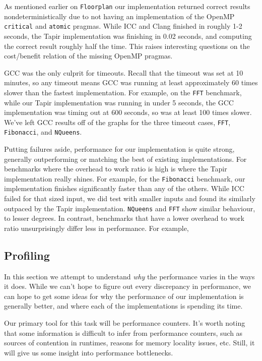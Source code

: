 \documentclass[sigconf]{acmart}
\begin{document}
As mentioned earlier on \texttt{Floorplan} our implementation returned correct
results nondeterministically due to not having an implementation of the OpenMP
\texttt{critical} and \texttt{atomic} pragmas. While ICC and Clang finished in
roughly 1-2 seconds, the Tapir implementation was finishing in 0.02 seconds,
and computing the correct result roughly half the time. This raises interesting
questions on the cost/benefit relation of the missing OpenMP pragmas.

GCC was the only culprit for timeouts. Recall that the timeout was set at 10
minutes, so any timeout means GCC was running at least approximately 60 times
slower than the fastest implementation. For example, on the \texttt{FFT}
benchmark, while our Tapir implementation was running in under 5 seconds, the
GCC implementation was timing out at 600 seconds, so was at least 100 times
slower. We've left GCC results off of the graphs for the three timeout cases,
\texttt{FFT}, \texttt{Fibonacci}, and \texttt{NQueens}.

Putting failures aside, performance for our implementation is quite strong,
generally outperforming or matching the best of existing implementations. For
benchmarks where the overhead to work ratio is high is where the Tapir
implementation really shines. For example, for the \texttt{Fibonacci}
benchmark, our implementation finishes significantly faster than any of the
others. While ICC failed for that sized input, we did test with smaller inputs
and found its similarly outpaced by the Tapir implementation.  \texttt{NQueens}
and \texttt{FFT} show similar behaviour, to lesser degrees. In contrast,
benchmarks that have a lower overhead to work ratio unsurprisingly differ less
in performance. For example,  

\subsection{Profiling}

In this section we attempt to understand \emph{why} the performance varies in
the ways it does. While we can't hope to figure out every discrepancy in
performance, we can hope to get some ideas for why the performance of our
implementation is generally better, and where each of the implementations is
spending its time.

Our primary tool for this task will be performance counters. It's worth noting
that some information is difficult to infer from performance counters, such as
sources of contention in runtimes, reasons for memory locality issues, etc.
Still, it will give us some insight into performance bottlenecks.
\end{document}
